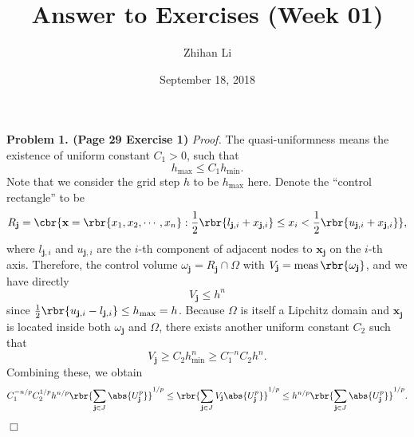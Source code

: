 \documentclass[english, nochinese]{pnote}
\title{Answer to Exercises (Week 01)}
\author{Zhihan Li}
\date{September 18, 2018}
\begin{document}
\maketitle

\textbf{Problem 1. (Page 29 Exercise 1)} \textit{Proof.} The quasi-uniformness means the existence of uniform constant $ C_1 > 0 $, such that
\begin{equation}
h_{\text{max}} \le C_1 h_{\text{min}}.
\end{equation}
Note that we consider the grid step $h$ to be $ h_{\text{max}} $ here. Denote the ``control rectangle'' to be
\begin{equation}
R_{\mathbf{j}} = \cbr{ \mathbf{x} = \rbr{ x_1, x_2, \cdots, x_n } : \frac{1}{2} \rbr{ l_{ \mathbf{j}, i } + x_{ \mathbf{j}, i } } \le x_i < \frac{1}{2} \rbr{ u_{\mathbf{j}, i } + x_{ \mathbf{j}, i } } },
\end{equation}
where $ l_{ \mathbf{j}, i } $ and $ u_{ \mathbf{j}, i } $ are the $i$-th component of adjacent nodes to $\mathbf{x}_{\mathbf{j}}$ on the $i$-th axis.
Therefore, the control volume $ \omega_{\mathbf{j}} = R_{\mathbf{j}} \cap \Omega $ with $ V_{\mathbf{j}} = \mathop{\text{meas}} \rbr{\omega_{\mathbf{j}}} $,
and we have directly
\begin{equation}
V_{\mathbf{j}} \le h^n
\end{equation}
since $ \frac{1}{2} \rbr{ u_{ \mathbf{j}, i } - l_{ \mathbf{j}, i } } \le h_{\text{max}} = h $.
Because $\Omega$ is itself a Lipchitz domain and $\mathbf{x}_{\mathbf{j}}$ is located inside both $\omega_{\mathbf{j}}$ and $\Omega$, there exists another uniform constant $C_2$ such that
\begin{equation}
V_{\mathbf{j}} \ge C_2 h_{\text{min}}^n \ge C_1^{-n} C_2 h^n.
\end{equation}
Combining these, we obtain
\begin{equation}
C_1^{ -n / p } C_2^{ 1 / p } h^{ n / p } \rbr{\sum_{ \mathbf{j} \in J }{\abs{U_{\mathbf{j}}^p}}}^{ 1 / p } \le \rbr{\sum_{ \mathbf{j} \in J }{ V_{\mathbf{j}} \abs{U_{\mathbf{j}}^p} }}^{ 1 / p } \le h^{ n / p } \rbr{\sum_{ \mathbf{j} \in J }{\abs{U_{\mathbf{j}}^p}}}^{ 1 / p }.
\end{equation}

\hfill$\Box$
\end{document}
